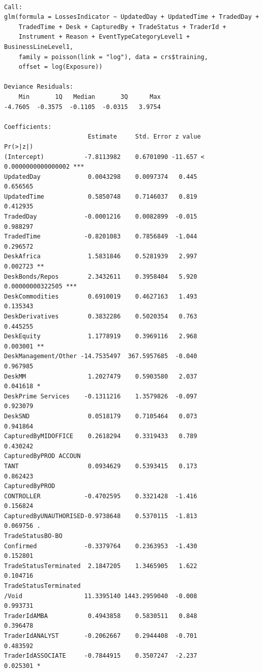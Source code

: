 \documentclass{DissertateUSU}
\begin{document}
\begin{verbatim}

Call:
glm(formula = LossesIndicator ~ UpdatedDay + UpdatedTime + TradedDay + 
    TradedTime + Desk + CapturedBy + TradeStatus + TraderId + 
    Instrument + Reason + EventTypeCategoryLevel1 + BusinessLineLevel1, 
    family = poisson(link = "log"), data = crs$training, 
    offset = log(Exposure))

Deviance Residuals: 
    Min       1Q   Median       3Q      Max  
-4.7605  -0.3575  -0.1105  -0.0315   3.9754  

Coefficients:
                       Estimate     Std. Error z value             Pr(>|z|)    
(Intercept)           -7.8113982    0.6701090 -11.657 < 0.0000000000000002 ***
UpdatedDay             0.0043298    0.0097374   0.445             0.656565    
UpdatedTime            0.5850748    0.7146037   0.819             0.412935    
TradedDay             -0.0001216    0.0082899  -0.015             0.988297    
TradedTime            -0.8201083    0.7856849  -1.044             0.296572    
DeskAfrica             1.5831846    0.5281939   2.997             0.002723 ** 
DeskBonds/Repos        2.3432611    0.3958404   5.920     0.00000000322505 ***
DeskCommodities        0.6910019    0.4627163   1.493             0.135343    
DeskDerivatives        0.3832286    0.5020354   0.763             0.445255    
DeskEquity             1.1778919    0.3969116   2.968             0.003001 ** 
DeskManagement/Other -14.7535497  367.5957685  -0.040             0.967985    
DeskMM                 1.2027479    0.5903580   2.037             0.041618 *  
DeskPrime Services    -0.1311216    1.3579826  -0.097             0.923079    
DeskSND                0.0518179    0.7105464   0.073             0.941864    
CapturedByMIDOFFICE    0.2618294    0.3319433   0.789             0.430242    
CapturedByPROD ACCOUN
TANT                   0.0934629    0.5393415   0.173             0.862423    
CapturedByPROD 
CONTROLLER            -0.4702595    0.3321428  -1.416             0.156824    
CapturedByUNAUTHORISED-0.9738648    0.5370115  -1.813             0.069756 .  
TradeStatusBO-BO 
Confirmed             -0.3379764    0.2363953  -1.430             0.152801    
TradeStatusTerminated  2.1847205    1.3465905   1.622             0.104716    
TradeStatusTerminated
/Void                 11.3395140 1443.2959040  -0.008             0.993731    
TraderIdAMBA           0.4943858    0.5830511   0.848             0.396478    
TraderIdANALYST       -0.2062667    0.2944408  -0.701             0.483592    
TraderIdASSOCIATE     -0.7844915    0.3507247  -2.237             0.025301 *  

\end{verbatim}
\end{document}
